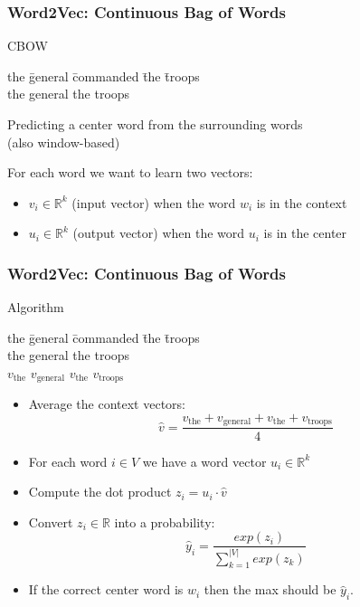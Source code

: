 \begin{frame}
\frametitle{Word2Vec: Continuous Bag of Words}
\begin{alertblock}{CBOW}
\begin{tabbing}
the \= general \= commanded \= the \= troops\kill \\
the \> general \> \rlap{\underline{\hphantom{commanded}}} \> the \> troops
\end{tabbing}
Predicting a center word from the surrounding words \\
(also window-based)
\end{alertblock}
\pause 
\begin{block}{For each word we want to learn two vectors:}
\begin{itemize}
	\item $v_i \in \mathbb{R}^k$ (input vector) when the word $w_i$ is in the context
	\item $u_i \in \mathbb{R}^k$ (output vector) when the word $u_i$ is in the center 
\end{itemize}
\end{block}
\end{frame}

\begin{frame}
\frametitle{Word2Vec: Continuous Bag of Words}
\begin{block}{Algorithm}
\begin{tabbing}
the \= general \= commanded \= the \= troops\kill \\
the \> general \> \rlap{\underline{\hphantom{commanded}}} \> the \> troops \\
$v_{\textrm{the}}$ \> $v_{\textrm{general}}$ \> \> $v_{\textrm{the}}$ \> $v_{\textrm{troops}}$ 
\end{tabbing}
\begin{itemize}[<+->]
	\item Average the context vectors:
	\[ \hat{v} = \frac{v_{\textrm{the}} + v_{\textrm{general}} + v_{\textrm{the}} + v_{\textrm{troops}}}{4} \]
	\item For each word $i \in V$ we have a word vector $u_i \in \mathbb{R}^k$
	\item Compute the dot product $z_i = u_i \cdot \hat{v}$
	\item Convert $z_i \in \mathbb{R}$ into a probability:
	\[ \hat{y}_i = \frac{exp(z_i)}{\sum_{k=1}^{|V|} exp(z_k)} \]
	\item If the correct center word is $w_i$ then the max should be $\hat{y}_i$.
\end{itemize}	
\end{block}
\end{frame}

